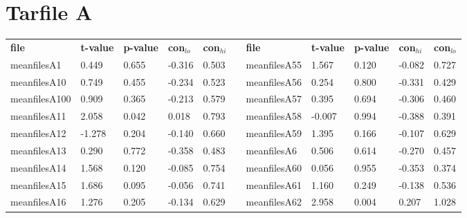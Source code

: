 \chapter{Tarfile A}

\begin{table}[h!]
\small
\begin{tabular}{lllllllllll}
\textbf{file} & \textbf{t-value} & \textbf{p-value} & \textbf{con$_{lo}$} & \textbf{con$_{hi}$} & \textbf{} & \textbf{file} & \textbf{t-value} & \textbf{p-value} & \textbf{con$_{hi}$} & \textbf{con$_{lo}$} \\ \cline{1-5} \cline{7-11} 
meanfilesA1   & 0.449            & 0.655            & -0.316           & 0.503            &           & meanfilesA55  & 1.567            & 0.120            & -0.082           & 0.727            \\
meanfilesA10  & 0.749            & 0.455            & -0.234           & 0.523            &           & meanfilesA56  & 0.254            & 0.800            & -0.331           & 0.429            \\
meanfilesA100 & 0.909            & 0.365            & -0.213           & 0.579            &           & meanfilesA57  & 0.395            & 0.694            & -0.306           & 0.460            \\
meanfilesA11  & 2.058            & 0.042            & 0.018            & 0.793            &           & meanfilesA58  & -0.007           & 0.994            & -0.388           & 0.391            \\
meanfilesA12  & -1.278           & 0.204            & -0.140           & 0.660            &           & meanfilesA59  & 1.395            & 0.166            & -0.107           & 0.629            \\
meanfilesA13  & 0.290            & 0.772            & -0.358           & 0.483            &           & meanfilesA6   & 0.506            & 0.614            & -0.270           & 0.457            \\
meanfilesA14  & 1.568            & 0.120            & -0.085           & 0.754            &           & meanfilesA60  & 0.056            & 0.955            & -0.353           & 0.374            \\
meanfilesA15  & 1.686            & 0.095            & -0.056           & 0.741            &           & meanfilesA61  & 1.160            & 0.249            & -0.138           & 0.536            \\
meanfilesA16  & 1.276            & 0.205            & -0.134           & 0.629            &           & meanfilesA62  & 2.958            & 0.004            & 0.207            & 1.028            \\

\end{tabular}
\end{table}
